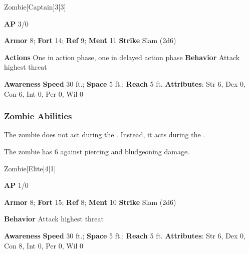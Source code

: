 \begin{monsection}{Zombie}[Captain]{3}[3]
\vspace{-1em}\vspace{-1em}
\begin{spellcontent}
\begin{spelltargetinginfo}
{\textbf{AP} 3/0}

\pari \textbf{Armor} 8;
\textbf{Fort} 14;
\textbf{Ref} 9;
\textbf{Ment} 11
\pari \textbf{Strike} Slam  (2d6)


\pari \textbf{Actions} One in action phase, one in delayed action phase
\pari \textbf{Behavior} Attack highest threat
\end{spelltargetinginfo}
\end{spellcontent}

\begin{monsterfooter}
\pari \textbf{Awareness} 
\pari \textbf{Speed} 30 ft.;
\textbf{Space} 5 ft.;
\textbf{Reach} 5 ft.
\pari \textbf{Attributes}:
Str 6,
Dex 0,
Con 6,
Int 0,
Per 0,
Wil 0
\end{monsterfooter}
\end{monsection}


\subsubsection{Zombie Abilities}

The zombie does not act during the .
Instead, it acts during the .

\vspace{0.5em}
The zombie has  6 against piercing and bludgeoning damage.

\begin{monsection}{Zombie}[Elite]{4}[1]
\vspace{-1em}\vspace{-1em}
\begin{spellcontent}
\begin{spelltargetinginfo}
{\textbf{AP} 1/0}

\pari \textbf{Armor} 8;
\textbf{Fort} 15;
\textbf{Ref} 8;
\textbf{Ment} 10
\pari \textbf{Strike} Slam  (2d6)



\pari \textbf{Behavior} Attack highest threat
\end{spelltargetinginfo}
\end{spellcontent}

\begin{monsterfooter}
\pari \textbf{Awareness} 
\pari \textbf{Speed} 30 ft.;
\textbf{Space} 5 ft.;
\textbf{Reach} 5 ft.
\pari \textbf{Attributes}:
Str 6,
Dex 0,
Con 8,
Int 0,
Per 0,
Wil 0
\end{monsterfooter}
\end{monsection}


